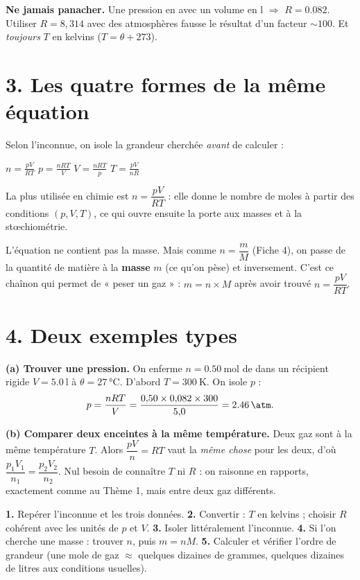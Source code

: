 \documentclass[11pt,a4paper]{article}
\begin{document}
\begin{piege}
\textbf{Ne jamais panacher.} Une pression en \si{\atm} avec un volume en \si{\litre} $\Rightarrow$
$R=\num{0.082}$. Utiliser $R=8{,}314$ avec des atmosphères fausse le résultat d'un facteur $\sim100$.
Et \emph{toujours} $T$ en kelvins ($T=\theta+273$).
\end{piege}

\section*{3. Les quatre formes de la même équation}

Selon l'inconnue, on isole la grandeur cherchée \emph{avant} de calculer :
\begin{center}\small
$\displaystyle n=\frac{pV}{RT}$ \qquad
$\displaystyle p=\frac{nRT}{V}$ \qquad
$\displaystyle V=\frac{nRT}{p}$ \qquad
$\displaystyle T=\frac{pV}{nR}$
\end{center}
La plus utilisée en chimie est $n=\dfrac{pV}{RT}$ : elle donne le nombre de moles à partir des conditions
$(p,V,T)$, ce qui ouvre ensuite la porte aux masses et à la stœchiométrie.

\begin{idee}[Le pont vers la masse : $n=\dfrac{m}{M}$]
L'équation ne contient pas la masse. Mais comme $n=\dfrac{m}{M}$ (Fiche 4), on passe de la quantité de
matière à la \textbf{masse} $m$ (ce qu'on pèse) et inversement. C'est ce chaînon qui permet de
« peser un gaz » : $m=n\times M$ après avoir trouvé $n=\dfrac{pV}{RT}$.
\end{idee}

\section*{4. Deux exemples types}

\textbf{(a) Trouver une pression.} On enferme $n=\qty{0.50}{\mole}$ de  dans un récipient rigide
$V=\qty{5.0}{\litre}$ à $\theta=\qty{27}{\degreeCelsius}$. D'abord $T=\qty{300}{\kelvin}$. On isole $p$ :
\[ p=\frac{nRT}{V}=\frac{0{,}50\times0{,}082\times300}{5{,}0}=\qty{2.46}{\atm}. \]

\textbf{(b) Comparer deux enceintes à la même température.} Deux gaz sont à la même température $T$. Alors
$\dfrac{pV}{n}=RT$ vaut la \emph{même chose} pour les deux, d'où
$\dfrac{p_1V_1}{n_1}=\dfrac{p_2V_2}{n_2}$. Nul besoin de connaître $T$ ni $R$ : on raisonne en rapports,
exactement comme au Thème 1, mais entre deux gaz différents.

\begin{methode}[Démarche pour un problème avec $pV=nRT$]
\textbf{1.} Repérer l'inconnue et les trois données. \quad
\textbf{2.} Convertir : $T$ en kelvins ; choisir $R$ cohérent avec les unités de $p$ et $V$. \quad
\textbf{3.} Isoler littéralement l'inconnue. \quad
\textbf{4.} Si l'on cherche une masse : trouver $n$, puis $m=nM$. \quad
\textbf{5.} Calculer et vérifier l'ordre de grandeur (une mole de gaz $\approx$ quelques dizaines de
grammes, quelques dizaines de litres aux conditions usuelles).
\end{methode}
\end{document}

